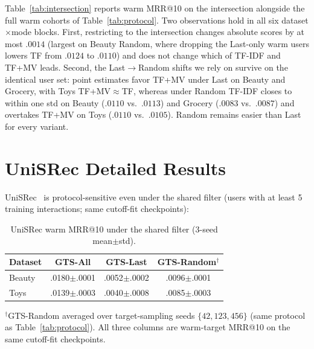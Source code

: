 \documentclass[sigconf,natbib=true,anonymous]{acmart}
\newcommand{\tfidf}{\textsc{TF-IDF}\xspace}
\newcommand{\tfmv}{\textsc{TF+MV}\xspace}
\begin{document}
Table~\ref{tab:intersection} reports warm MRR@10 on the intersection alongside the full warm cohorts of Table~\ref{tab:protocol}.
Two observations hold in all six dataset$\times$mode blocks.
First, restricting to the intersection changes absolute scores by at most $.0014$ (largest on Beauty Random, where dropping the Last-only warm users lowers TF from $.0124$ to $.0110$) and does not change which of \tfidf and \tfmv leads.
Second, the Last$\to$Random shifts we rely on survive on the identical user set: point estimates favor \tfmv under Last on Beauty and Grocery, with Toys TF+MV${}\approx{}$TF, whereas under Random \tfidf closes to within one std on Beauty ($.0110$ vs.\ $.0113$) and Grocery ($.0083$ vs.\ $.0087$) and overtakes \tfmv on Toys ($.0110$ vs.\ $.0105$).
Random remains easier than Last for every variant.

\section{UniSRec Detailed Results}
\label{app:unisrec}

UniSRec~\cite{hou2022unisrec} is protocol-sensitive even under the shared filter (users with at least 5 training interactions; same cutoff-fit checkpoints):

\begin{table}[H]
\centering
\caption{UniSRec warm MRR@10 under the shared filter (3-seed mean$\pm$std).}
\label{tab:unisrec-app}
\small
\begin{tabular}{@{}lccc@{}}
\toprule
Dataset & GTS-All & GTS-Last & GTS-Random$^\dagger$ \\
\midrule
Beauty & .0180$\pm$.0001 & .0052$\pm$.0002 & .0096$\pm$.0001 \\
Toys   & .0139$\pm$.0003 & .0040$\pm$.0008 & .0085$\pm$.0003 \\
\bottomrule
\end{tabular}
\end{table}

\noindent$^\dagger$GTS-Random averaged over target-sampling seeds $\{42,123,456\}$ (same protocol as Table~\ref{tab:protocol}).
All three columns are warm-target MRR@10 on the same cutoff-fit checkpoints.

\balance

\begingroup
\raggedbottom
{}

\endgroup
\end{document}
